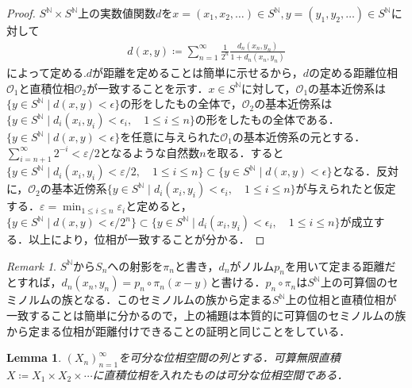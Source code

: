 \documentclass[dvipdfmx,autodetect-engine]{jsarticle}
\newtheorem{lemma}[theorem]{Lemma}
\theoremstyle{remark}
\newtheorem*{remark}{Remark}
\theoremstyle{definition}
\begin{document}
    \begin{proof}
    $S^{\mathbb{N}} \times S^{\mathbb{N}}$上の実数値関数$d$を$x=(x_1,x_2,\ldots)\in S^{\mathbb{N}},y=(y_1,y_2,\ldots)\in S^{\mathbb{N}}$に対して
    \begin{align}
        d(x,y) \coloneqq \sum_{n=1}^{\infty} \frac{1}{2^n} \frac{d_n(x_n,y_n)}{1+d_n(x_n,y_n)}
    \end{align}
    によって定める.$d$が距離を定めることは簡単に示せるから，$d$の定める距離位相$\mathcal{O}_1$と直積位相$\mathcal{O}_2$が一致することを示す．$x \in S^{\mathbb{N}}$に対して，$\mathcal{O}_1$の基本近傍系は$\{y \in S^{\mathbb{N}} \mid d(x,y) < \epsilon \}$の形をしたもの全体で，$\mathcal{O}_2$の基本近傍系は$\{y \in S^{\mathbb{N}} \mid d_i(x_i,y_i) < \epsilon_i,\quad 1 \leq i \leq n \}$の形をしたもの全体である．$\{y \in S^{\mathbb{N}} \mid d(x,y) < \epsilon \}$を任意に与えられた$\mathcal{O}_1$の基本近傍系の元とする．$\sum_{i=n+1}^{\infty} 2^{-i} < \varepsilon / 2$となるような自然数$n$を取る．すると$\{y \in S^{\mathbb{N}} \mid d_i(x_i,y_i) < \varepsilon /2 ,\quad 1 \leq i \leq n\} \subset \{y \in S^{\mathbb{N}} \mid d(x,y) < \epsilon \}$となる．反対に，$\mathcal{O}_2$の基本近傍系$\{y \in S^{\mathbb{N}} \mid d_i(x_i,y_i) < \epsilon_i,\quad 1 \leq i \leq n \}$が与えられたと仮定する．$\varepsilon = \min_{1\leq i\leq n} \varepsilon_i $と定めると，$\{y \in S^{\mathbb{N}} \mid d(x,y) < \epsilon / 2^n \} \subset \{y \in S^{\mathbb{N}} \mid d_i(x_i,y_i) < \epsilon_i,\quad 1 \leq i \leq n \}$が成立する．以上により，位相が一致することが分かる．
    \end{proof}
    
    
    \begin{remark}
    $S^{\mathbb{N}}$から$S_n$への射影を$\pi_n$と書き，$d_n$がノルム$p_n$を用いて定まる距離だとすれば，$d_n(x_n,y_n)=p_n \circ \pi_n (x-y)$と書ける．$p_n \circ \pi_n$は$S^{\mathbb{N}}$上の可算個のセミノルムの族となる．このセミノルムの族から定まる$S^{\mathbb{N}}$上の位相と直積位相が一致することは簡単に分かるので，上の補題は本質的に可算個のセミノルムの族から定まる位相が距離付けできることの証明と同じことをしている．
    \end{remark}
    
    
    \begin{lemma}\label{prod_sep}
    $(X_n)_{n=1}^{\infty}$を可分な位相空間の列とする．可算無限直積$X\coloneqq X_1 \times X_2 \times \cdots$に直積位相を入れたものは可分な位相空間である．
    \end{lemma}
    
\end{document}
